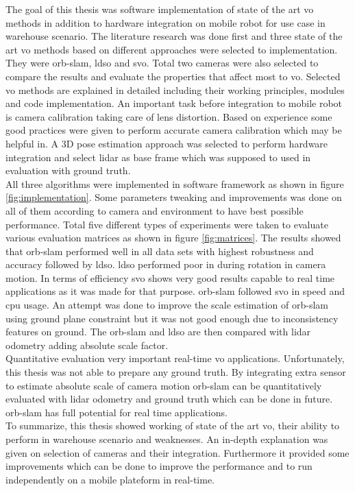 The goal of this thesis was software implementation of state of the art \acrshort{vo} methods in addition to hardware integration on mobile robot for use case in warehouse scenario. The literature research was done first and three state of the art \acrshort{vo} methods based on different approaches were selected to implementation. They were \acrshort{orb}-\acrshort{slam}, \acrshort{ldso} and \acrshort{svo}. Total two cameras were also selected to compare the results and evaluate the properties that affect most to \acrshort{vo}. Selected \acrshort{vo} methods are explained in detailed including their working principles, modules and code implementation. An important task before integration to mobile robot is camera calibration taking care of lens distortion. Based on experience some good practices were given to perform accurate camera calibration which may be helpful in. A 3D pose estimation approach was selected to perform hardware integration and select \acrshort{lidar} as base frame which was supposed to used in evaluation with ground truth.\\
\newline
All three algorithms were implemented in software framework as shown in figure \ref{fig:implementation}.
Some parameters tweaking and improvements was done on all of them according to camera and environment to have best possible performance. Total five different types of experiments were taken to evaluate various evaluation matrices as shown in figure \ref{fig:matrices}. The results showed that \acrshort{orb}-\acrshort{slam} performed well in all data sets with highest robustness and accuracy followed by \acrshort{ldso}. \acrshort{ldso} performed poor in during rotation in camera motion. In terms of efficiency \acrshort{svo} shows very good results capable to real time applications as it was made for that purpose. \acrshort{orb}-\acrshort{slam} followed \acrshort{svo} in speed and \acrshort{cpu} usage.
An attempt was done to improve the scale estimation of \acrshort{orb}-\acrshort{slam} using ground plane constraint but it was not good enough due to inconsistency features on ground. The \acrshort{orb}-\acrshort{slam} and \acrshort{ldso} are then compared with \acrshort{lidar} odometry adding absolute scale factor. \\
\newline
Quantitative evaluation very important real-time \acrshort{vo} applications. Unfortunately, this thesis was not able to prepare any ground truth. By integrating extra sensor to estimate absolute scale of camera motion \acrshort{orb}-\acrshort{slam} can be quantitatively evaluated with \acrshort{lidar} odometry and ground truth which can be done in future. \acrshort{orb}-\acrshort{slam} has full potential for real time applications.\\
\newline
To summarize, this thesis showed working of state of the art \acrshort{vo}, their ability to perform in warehouse scenario and weaknesses. An in-depth explanation was given on selection of cameras and their integration. Furthermore it provided some improvements which can be done to improve the performance and to run independently on a mobile plateform in real-time.